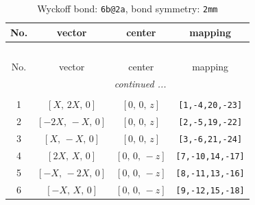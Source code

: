 \documentclass[fleqn,8pt]{jsarticle}
\begin{document}
\begin{longtable}{cccc}
\caption{Wyckoff bond: {\tt 6b@2a}, bond symmetry: {\tt 2mm}}
 \\
 \hline \hline
No. & vector & center & mapping \\ \hline \endfirsthead

\multicolumn{3}{l}{\tablename\ \thetable{}} \\
 \hline \hline
No. & vector & center & mapping \\ \hline \endhead

 \hline \hline
\multicolumn{3}{r}{\footnotesize\it continued ...} \\ \endfoot

 \hline \hline
\multicolumn{3}{r}{} \\ \endlastfoot

1 & $\left[ X,\, 2 X,\, 0 \right]$ & $\left[ 0,\, 0,\, z \right]$ & {\tt [1,-4,20,-23]} \\ \hline
2 & $\left[ - 2 X,\, - X,\, 0 \right]$ & $\left[ 0,\, 0,\, z \right]$ & {\tt [2,-5,19,-22]} \\ \hline
3 & $\left[ X,\, - X,\, 0 \right]$ & $\left[ 0,\, 0,\, z \right]$ & {\tt [3,-6,21,-24]} \\ \hline
4 & $\left[ 2 X,\, X,\, 0 \right]$ & $\left[ 0,\, 0,\, - z \right]$ & {\tt [7,-10,14,-17]} \\ \hline
5 & $\left[ - X,\, - 2 X,\, 0 \right]$ & $\left[ 0,\, 0,\, - z \right]$ & {\tt [8,-11,13,-16]} \\ \hline
6 & $\left[ - X,\, X,\, 0 \right]$ & $\left[ 0,\, 0,\, - z \right]$ & {\tt [9,-12,15,-18]} \\
\end{longtable}
\renewcommand{\arraystretch}{1.2}
\end{document}
